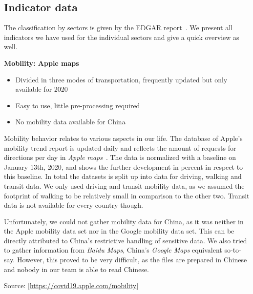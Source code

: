 

\subsection*{Indicator data}

The classification by sectors is given by the EDGAR report~\cite{crippa2019fossil}. We present all indicators we have used for the individual sectors and give a quick overview as well.

\textbf{Mobility: Apple maps}
\begin{itemize}
	\item Divided in three modes of transportation, frequently updated but only available for 2020
	\item Easy to use, little pre-processing required
	\item No mobility data available for China
\end{itemize}
Mobility behavior relates to various aspects in our life. The database of Apple's mobility trend report is updated daily and reflects the amount of requests for directions per day in \textit{Apple maps}~\cite{Apple}. The data is normalized with a baseline on January 13th, 2020, and shows the further development in percent in respect to this baseline. In total the datasets is split up into data for driving, walking and transit data. We only used driving and transit mobility data, as we assumed the \co footprint of walking to be relatively small in comparison to the other two. Transit data is not available for every country though.

Unfortunately, we could not gather mobility data for China, as it was neither in the Apple mobility data set nor in the Google mobility data set. This can be directly attributed to China's restrictive handling of sensitive data. We also tried to gather information from \textit{Baidu Maps}, China's \textit{Google Maps} equivalent so-to-say. However, this proved to be very difficult, as the files are prepared in Chinese and nobody in our team is able to read Chinese. 

Source: [\url{https://covid19.apple.com/mobility}]


